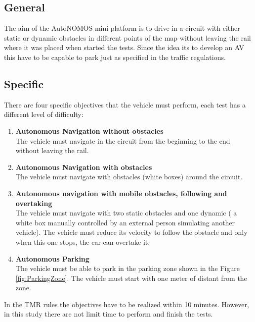     \subsection {General}
    The aim of the AutoNOMOS mini platform is to drive in a circuit with either static or dynamic obstacles in different points of the map without leaving the rail where it was placed when started the tests. Since the idea its to develop an AV this have to be capable to park just as specified in the traffic regulations.
    
    \subsection {Specific}
    There are four specific objectives that the vehicle must perform, each test has a different level of difficulty:
    \begin{enumerate}
        \item \textbf{Autonomous Navigation without obstacles}\\ The vehicle must navigate in the circuit from the beginning to the end without leaving the rail.
        \item \textbf{Autonomous Navigation with obstacles}\\ The vehicle must navigate with obstacles (white boxes) around the circuit.
        \item \textbf{Autonomous navigation with mobile obstacles, following and overtaking}\\ The vehicle must navigate with two static obstacles and one dynamic ( a white box manually controlled by an external person simulating another vehicle). The vehicle must reduce its velocity to follow the obstacle and only when this one stops, the car can overtake it.
        \item \textbf{Autonomous Parking}\\ The vehicle must be able to park in the parking zone shown in the Figure \ref{fig:ParkingZone}. The vehicle must start with one meter of distant from the zone.
    \end{enumerate}
In the TMR rules the objectives have to be realized within 10 minutes. However, in this study there are not limit time to perform and finish the tests.